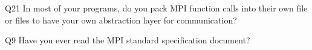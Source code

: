 \begin{description}%
\item{Q21} In most of your programs, do you pack MPI function calls into their own file or files to have your own abstraction layer for communication?%
\item{Q9} Have you ever read the MPI standard specification document?%
\end{description}%
